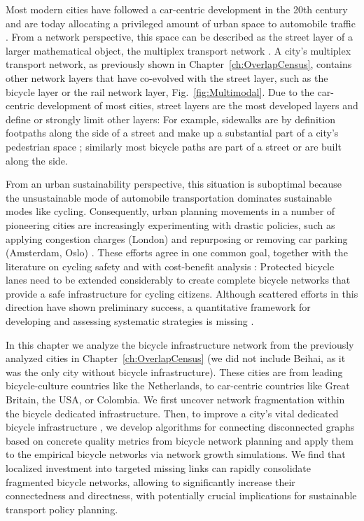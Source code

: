 Most modern cities have followed a car-centric development in the 20th century \cite{Jacobs1961Death} and are today allocating a privileged amount of urban space to automobile traffic \cite{Gossling2016Space,Szell2018Crowdsourced}. From a network perspective, this space can be described as the street layer of a larger mathematical object, the multiplex transport network \cite{morris2012transport,strano2015features,Aleta2017Multilayer}. A city's multiplex transport network, as previously shown in Chapter~\ref{ch:OverlapCensus}, contains other network layers that have co-evolved with the street layer, such as the bicycle layer or the rail network layer, Fig.~\ref{fig:Multimodal}. Due to the car-centric development of most cities, street layers are the most developed layers and define or strongly limit other layers: For example, sidewalks are by definition footpaths along the side of a street and make up a substantial part of a city's pedestrian space \cite{Gossling2016Space}; similarly most bicycle paths are part of a street or are built along the side.

From an urban sustainability perspective, this situation is suboptimal because the unsustainable mode of automobile transportation dominates sustainable modes like cycling. Consequently, urban planning movements in a number of pioneering cities are increasingly experimenting with drastic policies, such as applying congestion charges (London) \cite{Eliasson2008Lessons} and repurposing or removing car parking (Amsterdam, Oslo) \cite{Littke2016parklets,bliss2019hcp,Nieuwenhuijsen2016Car}. These efforts agree in one common goal, together with the literature on cycling safety \cite{Reynolds2009impact,Teschke2012route,Pucher2016Safer,aldred2018cycling} and with cost-benefit analysis \cite{gossling2019social}: Protected bicycle lanes need to be extended considerably to create complete bicycle networks that provide a safe infrastructure for cycling citizens. Although scattered efforts in this direction have shown preliminary success, a quantitative framework for developing and assessing systematic strategies is missing \cite{Gossling2020Cities}.

In this chapter we analyze the bicycle infrastructure network from the previously analyzed cities in Chapter~\ref{ch:OverlapCensus} (we did not include Beihai, as it was the only city without bicycle infrastructure). These cities are from leading bicycle-culture countries like the Netherlands, to car-centric countries like Great Britain, the USA, or Colombia. We first uncover network fragmentation within the bicycle dedicated infrastructure. Then, to improve a city's vital dedicated bicycle infrastructure \cite{Dill2013Bicycle,Schoner2014Missing,Hull2014Infrastructure,Buehler2016Bikable}, we develop algorithms for connecting disconnected graphs based on concrete quality metrics from bicycle network planning \cite{Twaddell2018Multimodal} and apply them to the empirical bicycle networks via network growth simulations. We find that localized investment into targeted missing links can rapidly consolidate fragmented bicycle networks, allowing to significantly increase their connectedness and directness, with potentially crucial implications for sustainable transport policy planning.

